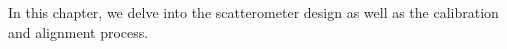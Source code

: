  \label{ch:acquisition}

In this chapter, we delve into the scatterometer design as well as the calibration and alignment process. 


